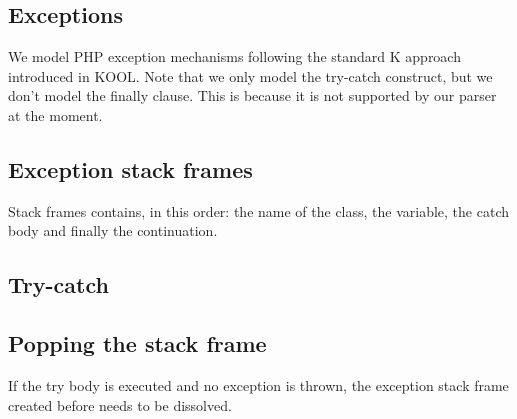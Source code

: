 \documentclass{article}
\begin{document}
\begin{kdefinition}
\begin{module}{}
\begin{kblock}[text]
 \section{Exceptions} 
		We model PHP exception mechanisms following the standard K approach introduced in 
		KOOL. Note that we only model the try-catch construct, but we don't model the 
		finally clause. This is because it is not supported by our parser at the moment. \end{kblock}
\begin{kblock}[text]
 \subsection{Exception stack frames} 
		Stack frames contains, in this order: the name of the class, the variable, the 
		catch body and finally the continuation. \end{kblock}

\begin{syntaxBlock}{}
\end{syntaxBlock}
\begin{kblock}[text]
 \subsection{Try-catch} \end{kblock}
\begin{kblock}[text]
 \subsection{Popping the stack frame} 
		If the try body is executed and no exception is thrown, the exception stack frame 
		created before needs to be dissolved. \end{kblock}

\begin{syntaxBlock}{}
\end{syntaxBlock}
\begin{kblock}[text]

\end{kblock}
\end{module}
\end{kdefinition}
\end{document}
